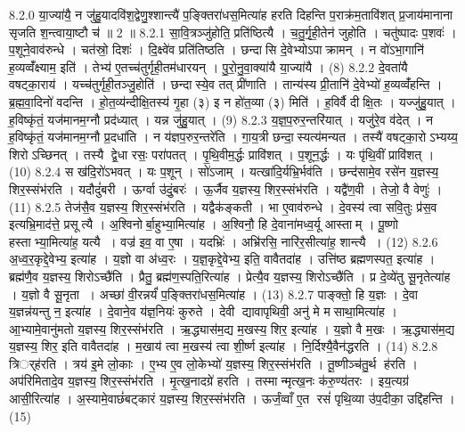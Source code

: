 8.2.0
या॒ज्या॑यै॒ न जु॑हु॒यादवि॑श॒द्वेणु॒श्शान्त्यै॑ प॒ङ्क्तिरा॑धस॒मित्या॑ह हरति दिहन्ति प॒राक्र॑म॒तावि॑शत् प्र॒जाय॑मानाना सृजति श॒न्त्वाया॒ष्टौ च॑ ॥ 2 ॥
8.2.1
सा॒वि॒त्रञ्जु॑होति॒ प्रति॑ष्ठित्यै । च॒तु॒र्गृ॒ही॒तेन॑ जुहोति । चतु॑ष्पादः प॒शवः॑ । प॒शूने॒वाव॑रुन्धे । चत॑स्रो॒ दिशः॑ । दि॒क्ष्वे॑व प्रति॑तिष्ठति । छन्दासि दे॒वेभ्योऽपाक्रामन् । न वो॑ऽभा॒गानि॑ ह॒व्यव्वँ॑क्ष्याम॒ इति॑ । तेभ्य॑ ए॒तच्च॑तुर्गृही॒तम॑धारयन् । पु॒रो॒नु॒वा॒क्या॑यै या॒ज्या॑यै । (8)
8.2.2
दे॒वता॑यै वषट्का॒राय॑ । यच्च॑तुर्गृही॒तञ्जु॒होति॑ । छन्दास्ये॒व तत् प्री॑णाति । तान्य॑स्य प्री॒तानि॑ दे॒वेभ्यो॑ ह॒व्यव्वँ॑हन्ति । ब्र॒ह्म॒वा॒दिनो॑ वदन्ति । हो॒त॒व्य॑न्दीक्षि॒तस्य॑ गृ॒हा (३) इ न हो॑त॒व्या (३) मिति॑ । ह॒विर्वै दीक्षि॒तः । यज्जु॑हु॒यात् । ह॒विष्कृ॑तं॒ यज॑मानम॒ग्नौ प्रद॑ध्यात् । यन्न जु॑हु॒यात् । (9)
8.2.3
य॒ज्ञ॒प॒रुर॒न्तरि॑यात् । यजु॑रे॒व व॑देत् । न ह॒विष्कृ॑तं॒ यज॑मानम॒ग्नौ प्र॒दधा॑ति । न य॑ज्ञप॒रुर॒न्तरे॑ति । गा॒य॒त्री छन्दा॒स्यत्य॑मन्यत । तस्यै॑ वषट्का॒रोऽभ्यय्य॒ शिरोऽच्छिनत् । तस्यै द्वे॒धा रसः॒ परा॑पतत् । पृ॒थि॒वीम॒र्द्धः प्रावि॑शत् । प॒शून॒र्द्धः । यः पृ॑थि॒वीं प्रावि॑शत् । (10)
8.2.4
स ख॑दि॒रो॑ऽभवत् । यः प॒शून् । सो॑ऽजाम् । यत्खा॑दि॒र्यभ्रि॒र्भव॑ति । छन्द॑सामे॒व रसे॑न य॒ज्ञस्य॒ शिर॒स्संभ॑रति । यदौदुं॑बरी । ऊर्ग्वा उ॑दुं॒बरः॑ । ऊ॒र्जैव य॒ज्ञस्य॒ शिर॒स्संभ॑रति । यद्वै॑ण॒वी । तेजो॒ वै वेणुः॑ । (11)
8.2.5
तेज॑सै॒व य॒ज्ञस्य॒ शिर॒स्संभ॑रति । यद्वैक॑ङ्कती । भा ए॒वाव॑रुन्धे । दे॒वस्य॑ त्वा सवि॒तुः प्र॑स॒व इत्यभ्रि॒माद॑त्ते॒ प्रसूत्यै । अ॒श्विनोर्बा॒हुभ्या॒मित्या॑ह । अ॒श्विनौ॒ हि दे॒वाना॑मध्व॒र्यू आस्ताम् । पू॒ष्णो हस्ताभ्या॒मित्या॑ह॒ यत्यै । वज्र॑ इव॒ वा ए॒षा । यदभ्रिः॑ । अभ्रि॑रसि॒ नारि॑र॒सीत्या॑ह॒ शान्त्यै । (12)
8.2.6
अ॒ध्व॒र॒कृद्दे॒वेभ्य॒ इत्या॑ह । य॒ज्ञो वा अ॑ध्व॒रः । य॒ज्ञ॒कृद्दे॒वेभ्य॒ इति॒ वावैतदा॑ह । उत्ति॑ष्ठ ब्रह्मणस्पत॒ इत्या॑ह । ब्रह्म॑णै॒व य॒ज्ञस्य॒ शिरोऽच्छै॑ति । प्रैतु॒ ब्रह्म॑ण॒स्पति॒रित्या॑ह । प्रेत्यै॒व य॒ज्ञस्य॒ शिरोऽच्छै॑ति । प्र दे॒व्ये॑तु सू॒नृतेत्या॑ह । य॒ज्ञो वै सू॒नृता । अच्छा॑ वी॒रन्नर्यं॑ प॒ङ्क्तिरा॑धस॒मित्या॑ह । (13)
8.2.7
पाङ्क्तो॒ हि य॒ज्ञः । दे॒वा य॒ज्ञन्न॑यन्तु न॒ इत्या॑ह । दे॒वाने॒व य॑ज्ञ॒नियः॑ कुरुते । देवी द्यावापृथिवी॒ अनु॑ मे मसाथा॒मित्या॑ह । आ॒भ्यामे॒वानु॑मतो य॒ज्ञस्य॒ शिर॒स्संभ॑रति । ऋ॒द्ध्यास॑म॒द्य म॒खस्य॒ शिर॒ इत्या॑ह । य॒ज्ञो वै म॒खः । ऋ॒द्ध्यास॑म॒द्य य॒ज्ञस्य॒ शिर॒ इति वावैतदा॑ह । म॒खाय॑ त्वा म॒खस्य॑ त्वा शी॒र्ष्ण इत्या॑ह । नि॒र्दिश्यै॒वैन॑द्धरति । (14)
8.2.8
त्रिर््ह॑रति । त्रय॑ इ॒मे लो॒काः । ए॒भ्य ए॒व लो॒केभ्यो॑ य॒ज्ञस्य॒ शिर॒स्संभ॑रति । तू॒ष्णीञ्च॑तु॒र्थ ह॑रति । अप॑रिमितादे॒व य॒ज्ञस्य॒ शिर॒स्संभ॑रति । मृ॒त्ख॒नादग्रे॑ हरति । तस्मान्मृत्ख॒नः क॑रु॒ण्य॑तरः । इय॒त्यग्र॑ आसी॒रित्या॑ह । अ॒स्यामे॒वाछं॑बट्कारं य॒ज्ञस्य॒ शिर॒स्संभ॑रति । ऊर्जं॒व्वाँ ए॒त रसं॑ पृथि॒व्या उ॑प॒दीका॒ उद्दि॑हन्ति । (15)
